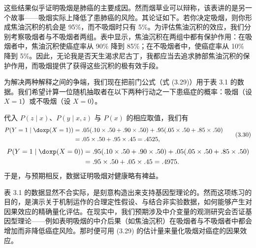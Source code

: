 这些结果似乎证明吸烟是肺癌的主要成因。然而烟草业可以辩称，该表讲的是另一个故事——吸烟实际上降低了患肺癌的风险。其论证如下。若你决定吸烟，则你形成焦油沉积的机会是 95\%，而不吸烟时只有 5\%。为评估焦油沉积的效应，我们分别考察吸烟者与不吸烟者两组。表中显示，焦油沉积在两组中都有保护作用：在吸烟者中，焦油沉积使癌症率从 90\% 降到 85\%；在不吸烟者中，使癌症率从 10\% 降到 5\%。因此，无论我是否天生渴求尼古丁，我都应当去追求肺部焦油沉积的保护作用，而吸烟提供了获得这些沉积的极有效手段。

为解决两种解释之间的争端，我们现在把前门公式（式 \textup{(3.29)}）用于表 3.1 的数据。我们希望计算一位随机抽取者在以下两种行动之一下患癌症的概率：吸烟（设 $X=1$）或不吸烟（设 $X=0$）。

代入 $P(z\mid x)$、$P(y\mid x,z)$ 与 $P(x)$ 的相应取值，我们有
\begin{equation}
\begin{aligned}
P(Y=1\mid\doxp(X=1)) &= .05(.10\times.50+.90\times.50)+.95(.05\times.50+.85\times.50)\\
&= .05\times.50+.95\times.45=.4525,
\end{aligned} \tag{3.30}
\end{equation}
\begin{equation}
\begin{aligned}
P(Y=1\mid\doxp(X=0)) &= .95(.10\times.50+.90\times.50)+.05(.05\times.50+.85\times.50)\\
&= .95\times.50+.05\times.45=.4975.
\end{aligned}
\end{equation}
于是，与预期相反，数据证明吸烟对健康略有裨益。

表 3.1 的数据显然不合实际，是刻意构造出来支持基因型理论的。然而这项练习的目的，是演示关于机制运作的合理定性假设、与结合非实验数据，如何能够产生对因果效应的精确量化评估。在现实中，我们预期涉及中介变量的观测研究会否证基因型理论——例如表明吸烟的中介后果（如焦油沉积）在吸烟者与不吸烟者中都会增加而非降低癌症风险。那时便可用 \textup{(3.29)} 的估计量来量化吸烟对癌症的因果效应。
